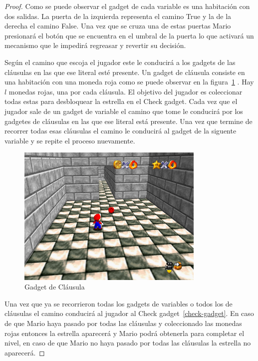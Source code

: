 \documentclass[runningheads]{llncs}
\begin{document}
\begin{proof}
Como se puede observar el gadget de cada variable es una habitación con dos salidas. La puerta de la izquierda representa el camino True
y la de la derecha el camino False. Una vez que se cruza una de estas puertas Mario presionará el botón que se encuentra en el umbral
de la puerta lo que activará un mecanismo que le impedirá regreasar y revertir su decisión.

Según el camino que escoja el jugador este le conducirá a los gadgets de las cláusulas en las que ese literal esté presente. Un gadget de
cláusula consiste en una habitación con una moneda roja como se puede observar en la figura~\ref{clause-gadget} . Hay $l$ monedas rojas, una por cada cláusula. El objetivo del jugador es 
coleccionar todas estas para desbloquear la estrella en el Check gadget. Cada vez que el jugador sale de un gadget de variable
el camino que tome le conducirá por los gadgetes de cláusulas en las que ese literal está presente. Una vez que termine de recorrer todas esas
cláusulas el camino le conducirá al gadget de la siguente variable y se repite el proceso nuevamente.

\begin{figure}[htbp]
    \centering
    \includegraphics[width=0.8\textwidth]{./Pictures/clausule-gadget.png}
    \caption{Gadget de Cláusula}
    \label{clause-gadget}
\end{figure}

Una vez que ya se recorrieron todas los gadgets de variables o todos los de cláusulas el camino conducirá al jugador al Check gadget~\ref{check-gadget}.
En caso de que Mario haya pasado por todas las cláusulas y coleccionado las monedas rojas entonces la estrella aparecerá y Mario podrá
obtenerla para completar el nivel, en caso de que Mario no haya pasado por todas las cláusulas la estrella no aparecerá.


\end{proof}
\end{document}
